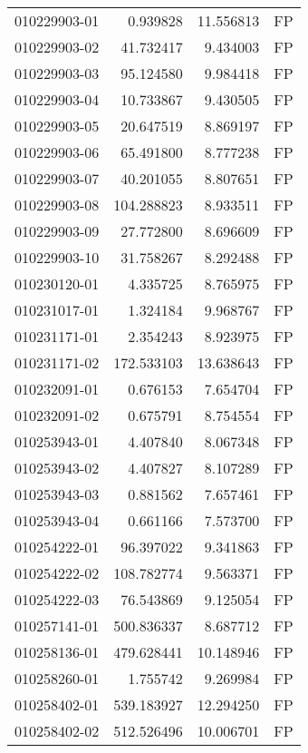 \begin{tabular}{lrrl}
010229903-01 &    0.939828 &      11.556813 &   FP \\
010229903-02 &   41.732417 &       9.434003 &   FP \\
010229903-03 &   95.124580 &       9.984418 &   FP \\
010229903-04 &   10.733867 &       9.430505 &   FP \\
010229903-05 &   20.647519 &       8.869197 &   FP \\
010229903-06 &   65.491800 &       8.777238 &   FP \\
010229903-07 &   40.201055 &       8.807651 &   FP \\
010229903-08 &  104.288823 &       8.933511 &   FP \\
010229903-09 &   27.772800 &       8.696609 &   FP \\
010229903-10 &   31.758267 &       8.292488 &   FP \\
010230120-01 &    4.335725 &       8.765975 &   FP \\
010231017-01 &    1.324184 &       9.968767 &   FP \\
010231171-01 &    2.354243 &       8.923975 &   FP \\
010231171-02 &  172.533103 &      13.638643 &   FP \\
010232091-01 &    0.676153 &       7.654704 &   FP \\
010232091-02 &    0.675791 &       8.754554 &   FP \\
010253943-01 &    4.407840 &       8.067348 &   FP \\
010253943-02 &    4.407827 &       8.107289 &   FP \\
010253943-03 &    0.881562 &       7.657461 &   FP \\
010253943-04 &    0.661166 &       7.573700 &   FP \\
010254222-01 &   96.397022 &       9.341863 &   FP \\
010254222-02 &  108.782774 &       9.563371 &   FP \\
010254222-03 &   76.543869 &       9.125054 &   FP \\
010257141-01 &  500.836337 &       8.687712 &   FP \\
010258136-01 &  479.628441 &      10.148946 &   FP \\
010258260-01 &    1.755742 &       9.269984 &   FP \\
010258402-01 &  539.183927 &      12.294250 &   FP \\
010258402-02 &  512.526496 &      10.006701 &   FP \\

\end{tabular}
